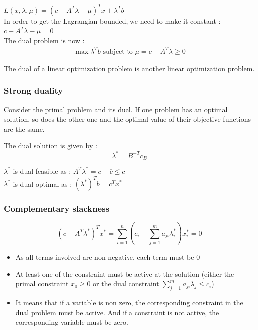 \documentclass[../main.tex]{subfiles}
\begin{document}
$L(x,\lambda,\mu) = (c-A^T\lambda - \mu)^Tx+\lambda^Tb$\\

In order to get the Lagrangian bounded, we need to make it constant : $c-A^T\lambda-\mu = 0$\\

The dual problem is now : \begin{equation}
    \begin{gathered}
        \max \lambda^Tb \text{ subject to } \mu = c-A^T\lambda \geq 0
    \end{gathered}
\end{equation}

\begin{theoremen}
    The dual of a linear optimization problem is another linear optimization problem. \\
\end{theoremen}

\subsubsection{Strong duality}
\begin{theoremen}
    Consider the primal problem and its dual. If one problem has an optimal solution, so does the other one and the optimal value of their objective functions are the same.
\end{theoremen}

The dual solution is given by : \begin{equation}
    \lambda^* = B^{-T} c_B
\end{equation}

$\lambda^*$ is dual-feasible as : $A^T\lambda^* = c-\overline{c}\leq c$\\
$\lambda^*$ is dual-optimal as : $(\lambda^*)^Tb = c^Tx^*$\\

\subsubsection{Complementary slackness}
\begin{equation}
    (c-A^T\lambda^*)^T x^* = \sum_{i=1}^n (c_i - \sum_{j=1}^m a_{ji} \lambda_i^*)x_i^* =0
\end{equation}
\begin{itemize}
    \item As all terms involved are non-negative, each term must be 0\\
    \item At least one of the constraint must be active at the solution (either the primal constraint $x_0\geq 0$ or the dual constraint $\sum_{j=1}^m a_{ji}\lambda_j \leq c_i$)\\
    \item It means that if a variable is non zero, the corresponding constraint in
the dual problem must be active. And if a constraint is not active, the
corresponding variable must be zero.\\
\end{itemize}
\end{document}
